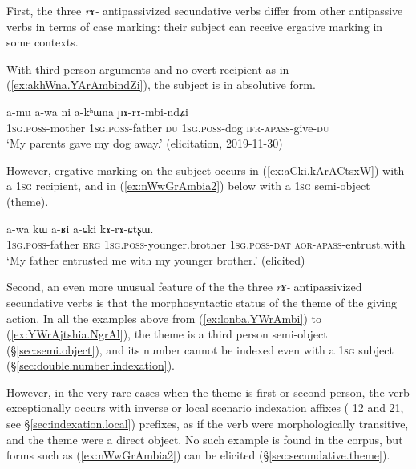 First, the three \textit{rɤ-} antipassivized secundative verbs differ from other antipassive verbs in terms of case marking: their subject can receive ergative marking in some contexts.  

With third person arguments and no overt recipient as in (\ref{ex:akhWna.YArAmbindZi}), the subject  is in absolutive form.

\begin{exe}
\ex \label{ex:akhWna.YArAmbindZi}
\gll a-mu a-wa ni a-kʰɯna ɲɤ-rɤ-mbi-ndʑi \\
\textsc{1sg}.\textsc{poss}-mother \textsc{1sg}.\textsc{poss}-father \textsc{du} \textsc{1sg}.\textsc{poss}-dog  \textsc{ifr}-\textsc{apass}-give-\textsc{du} \\
\glt `My parents gave my dog away.' (elicitation, 2019-11-30)
 \end{exe}
 
However, ergative marking on the subject occurs in (\ref{ex:aCki.kArACtsxW}) with a \textsc{1sg} recipient, and in (\ref{ex:nWwGrAmbia2}) below with a \textsc{1sg} semi-object (theme).
 
\begin{exe}
\ex \label{ex:aCki.kArACtsxW}
\gll a-wa kɯ a-ʁi a-ɕki kɤ-rɤ-ɕtʂɯ. \\
 \textsc{1sg}.\textsc{poss}-father \textsc{erg} \textsc{1sg}.\textsc{poss}-younger.brother \textsc{1sg}.\textsc{poss}-\textsc{dat} \textsc{aor}-\textsc{apass}-entrust.with \\
 \glt `My father entrusted me with my younger brother.' (elicited)
 \end{exe} 
 
Second, an even more unusual feature of the the three \textit{rɤ-} antipassivized secundative verbs is that the morphosyntactic status of the theme of the giving action. In all the examples above from (\ref{ex:lonba.YWrAmbi}) to (\ref{ex:YWrAjtshia.NgrAl}), the theme is a third person semi-object (§\ref{sec:semi.object}), and its number cannot be indexed even with a \textsc{1sg} subject  (§\ref{sec:double.number.indexation}).

However, in the very rare cases when the theme is first or second person, the verb    exceptionally occurs with inverse  or local scenario indexation affixes ( 1\fl{}2 and   2\fl{}1, see §\ref{sec:indexation.local}) prefixes, as if the verb were morphologically transitive, and the theme were a direct object. No such example is found in the corpus, but forms such as (\ref{ex:nWwGrAmbia2}) can be elicited (§\ref{sec:secundative.theme}).
 
